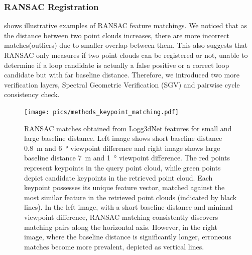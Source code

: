 \subsubsection*{\textbf{RANSAC Registration}}  
 shows illustrative examples of RANSAC feature matchings. We noticed that as the distance between two point clouds increases, there are more incorrect matches(outliers) due to smaller overlap between them. This also suggests that RANSAC only measures if two point clouds can be registered or not, unable to determine if a loop candidate is actually a false positive or a correct loop candidate but with far baseline distance. Therefore, we introduced two more verification layers, Spectral Geometric Verification (SGV) and pairwise cycle consistency check. 
\begin{figure}[htbp]
  \centering
  \texttt{[image: pics/methods\_keypoint\_matching.pdf]}
  \caption{RANSAC matches obtained from Logg3dNet features for small and large baseline distance. Left image shows short baseline distance \SI{0.8}{\meter} and \SI{6}{\degree} viewpoint difference and right image shows large baseline distance \SI{7}{\meter} and \SI{1}{\degree} viewpoint difference. 
  The red points represent keypoints in the query point cloud, while green points depict candidate keypoints in the retrieved point cloud. Each keypoint possesses its unique feature vector, matched against the most similar feature in the retrieved point clouds (indicated by black lines). In the left image, with a short baseline distance and minimal viewpoint difference, RANSAC matching consistently discovers matching pairs along the horizontal axis. However, in the right image, where the baseline distance is significantly longer, erroneous matches become more prevalent, depicted as vertical lines.}
  \label{fig:RANSAC_keypoint_matching}
\end{figure}

